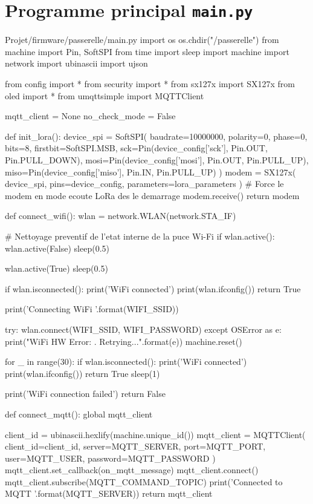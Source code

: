 \documentclass[a4paper,11pt]{report}
\begin{document}
\section{Programme principal \texttt{main.py}}

\begin{pycode}{Projet/firmware/passerelle/main.py}
import os
os.chdir("/passerelle")
from machine import Pin, SoftSPI
from time import sleep
import machine
import network
import ubinascii
import ujson

from config import *
from security import *
from sx127x import SX127x
from oled import *
from umqttsimple import MQTTClient


mqtt_client = None
no_check_mode = False


def init_lora():
    device_spi = SoftSPI(
        baudrate=10000000,
        polarity=0,
        phase=0,
        bits=8,
        firstbit=SoftSPI.MSB,
        sck=Pin(device_config['sck'], Pin.OUT, Pin.PULL_DOWN),
        mosi=Pin(device_config['mosi'], Pin.OUT, Pin.PULL_UP),
        miso=Pin(device_config['miso'], Pin.IN, Pin.PULL_UP)
    )
    modem = SX127x(
        device_spi,
        pins=device_config,
        parameters=lora_parameters
    )
    # Force le modem en mode ecoute LoRa des le demarrage
    modem.receive()
    return modem


def connect_wifi():
    wlan = network.WLAN(network.STA_IF)

    # Nettoyage preventif de l'etat interne de la puce Wi-Fi
    if wlan.active():
        wlan.active(False)
        sleep(0.5)

    wlan.active(True)
    sleep(0.5)

    if wlan.isconnected():
        print('WiFi connected')
        print(wlan.ifconfig())
        return True

    print('Connecting WiFi {}'.format(WIFI_SSID))

    try:
        wlan.connect(WIFI_SSID, WIFI_PASSWORD)
    except OSError as e:
        print("WiFi HW Error: {}. Retrying...".format(e))
        machine.reset()

    for _ in range(30):
        if wlan.isconnected():
            print('WiFi connected')
            print(wlan.ifconfig())
            return True
        sleep(1)

    print('WiFi connection failed')
    return False


def connect_mqtt():
    global mqtt_client

    client_id = ubinascii.hexlify(machine.unique_id())
    mqtt_client = MQTTClient(
        client_id=client_id,
        server=MQTT_SERVER,
        port=MQTT_PORT,
        user=MQTT_USER,
        password=MQTT_PASSWORD
    )
    mqtt_client.set_callback(on_mqtt_message)
    mqtt_client.connect()
    mqtt_client.subscribe(MQTT_COMMAND_TOPIC)
    print('Connected to MQTT {}'.format(MQTT_SERVER))
    return mqtt_client



\end{pycode}
\end{document}
